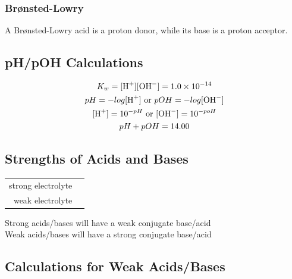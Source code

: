 \documentclass[11pt]{article}
\begin{document}
    \subsubsection{Br\o nsted-Lowry}
    A Br\o nsted-Lowry acid is a proton donor, while its base is a proton acceptor.

    \begin{center}
    \end{center}

    \newpage
    \subsection{pH/pOH Calculations}

    \begin{equation*}
        \begin{gathered}
            K_{w} = [\ce{H^{+}}][\ce{OH^{-}}] = 1.0 \times 10^{-14} \\
            pH = -log[\ce{H^{+}}] \text{ or } pOH = -log[\ce{OH^{-}}] \\
            [\ce{H^{+}}] = 10^{-pH} \text{ or } [\ce{OH^{-}}] = 10^{-poH} \\
            pH + pOH = 14.00
        \end{gathered}
    \end{equation*}

    \subsection{Strengths of Acids and Bases}
    
    \begin{center}
        \begin{tabular}{r l}
            strong electrolyte & \ce{->} \\
            weak electrolyte & \ce{<=>}
        \end{tabular}
        \break
        Strong acids/bases will have a weak conjugate base/acid \\
        Weak acids/bases will have a strong conjugate base/acid
    \end{center}

    \subsection{Calculations for Weak Acids/Bases}
\end{document}
